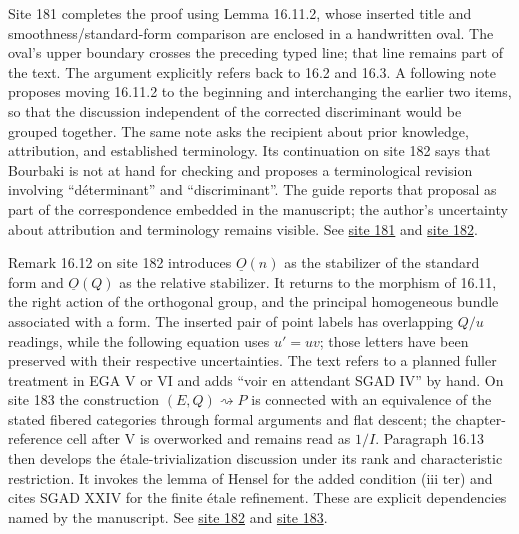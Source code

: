 \documentclass[10pt,a4paper]{article}
\begin{document}
Site 181 completes the proof using Lemma 16.11.2, whose inserted title and smoothness/standard-form comparison are enclosed in a handwritten oval. The oval's upper boundary crosses the preceding typed line; that line remains part of the text. The argument explicitly refers back to 16.2 and 16.3. A following note proposes moving 16.11.2 to the beginning and interchanging the earlier two items, so that the discussion independent of the corrected discriminant would be grouped together. The same note asks the recipient about prior knowledge, attribution, and established terminology. Its continuation on site 182 says that Bourbaki is not at hand for checking and proposes a terminological revision involving ``déterminant'' and ``discriminant''. The guide reports that proposal as part of the correspondence embedded in the manuscript; the author's uncertainty about attribution and terminology remains visible. See \href{https://grothendieck.umontpellier.fr/web/viewer.html?file=../25.pdf#page=182}{site 181} and \href{https://grothendieck.umontpellier.fr/web/viewer.html?file=../25.pdf#page=183}{site 182}.

Remark 16.12 on site 182 introduces \(\underline O(n)\) as the stabilizer of the standard form and \(\underline O(Q)\) as the relative stabilizer. It returns to the morphism of 16.11, the right action of the orthogonal group, and the principal homogeneous bundle associated with a form. The inserted pair of point labels has overlapping \(Q/u\) readings, while the following equation uses \(u'=uv\); those letters have been preserved with their respective uncertainties. The text refers to a planned fuller treatment in EGA V or VI and adds ``voir en attendant SGAD IV'' by hand. On site 183 the construction \((E,Q)\rightsquigarrow P\) is connected with an equivalence of the stated fibered categories through formal arguments and flat descent; the chapter-reference cell after V is overworked and remains read as \(1/I\). Paragraph 16.13 then develops the étale-trivialization discussion under its rank and characteristic restriction. It invokes the lemma of Hensel for the added condition (iii ter) and cites SGAD XXIV for the finite étale refinement. These are explicit dependencies named by the manuscript. See \href{https://grothendieck.umontpellier.fr/web/viewer.html?file=../25.pdf#page=183}{site 182} and \href{https://grothendieck.umontpellier.fr/web/viewer.html?file=../25.pdf#page=184}{site 183}.
\end{document}

